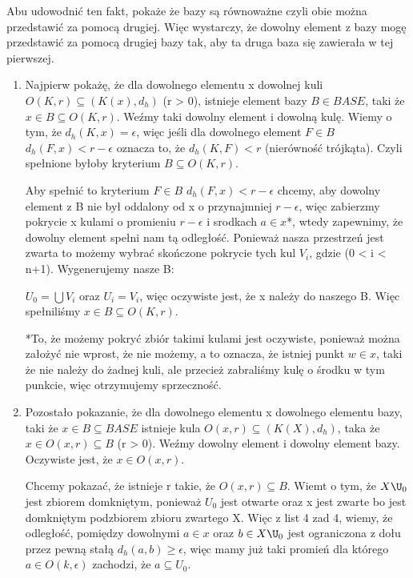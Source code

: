 \documentclass[12pt,a4paper]{article}
\begin{document}
Abu udowodnić ten fakt, pokaże że bazy są równoważne czyli obie można przedstawić za pomocą drugiej. Więc wystarczy, że dowolny element z bazy mogę przedstawić za pomocą drugiej bazy tak, aby ta druga baza się zawierała w tej pierwszej.
\begin{enumerate}
    \item Najpierw pokażę, że dla dowolnego elementu x dowolnej kuli $O(K,r) \subseteq (K(x),d_h)$ (r > 0), istnieje element bazy $B \in BASE$, taki że $x \in B \subseteq O(K,r)$. Weźmy taki dowolny element i dowolną kulę. Wiemy o tym, że $d_h(K,x) = \epsilon$, więc jeśli dla dowolnego element $F \in B$ $d_h(F, x) < r - \epsilon$ oznacza to, że $d_h(K,F) < r$ (nierówność trójkąta). Czyli spełnione byłoby kryterium $B \subseteq O(K,r)$. 

    Aby spełnić to kryterium  $F \in B$ $d_h(F, x) < r - \epsilon$ chcemy, aby dowolny element z B nie był oddalony od x o przynajmniej $ r - \epsilon$, więc zabierzmy pokrycie x kulami o promieniu  $r - \epsilon$ i srodkach $a\in x$*, wtedy zapewnimy, że dowolny element spełni nam tą odległość. Ponieważ nasza przestrzeń jest zwarta to możemy wybrać skończone pokrycie tych kul $V_i$, gdzie (0 < i < n+1). Wygenerujemy nasze B:
    
    $U_0 = \bigcup V_i$ oraz $U_i = V_i$, więc oczywiste jest, że x należy do naszego B. Więc spełniliśmy $x \in B \subseteq O(K,r)$.
    
    *To, że możemy pokryć zbiór takimi kulami jest oczywiste, ponieważ można założyć nie wprost, że nie możemy, a to oznacza, że istniej punkt $w \in x$, taki że nie należy do żadnej kuli, ale przecież zabraliśmy kulę o środku w tym punkcie, więc otrzymujemy sprzeczność.

    \item Pozostało pokazanie, że dla dowolnego elementu x dowolnego elementu bazy, taki że $x \in B \subseteq BASE$ istnieje kula $O(x,r) \subseteq (K(X), d_h)$, taka że $x \in O(x,r) \subseteq B$ (r > 0).
    Weźmy dowolny element i dowolny element bazy. Oczywiste jest, że $x \in O(x,r)$.
    
    Chcemy pokazać, że istnieje r takie, że $O(x,r) \subseteq B$. Wiemt o tym, że $X\U_0$ jest zbiorem domkniętym, ponieważ $U_0$ jest otwarte oraz x jest zwarte bo jest domkniętym podzbiorem zbioru zwartego X. Więc z list 4 zad 4, wiemy, że odległość, pomiędzy dowolnymi $a \in x$ oraz $b \in X\U_0$ jest ograniczona z dołu przez pewną stałą $d_h(a,b) \geq \epsilon$, więc mamy już taki promień dla którego $a \in O(k,\epsilon)$ zachodzi, że $a \subseteq U_0$.
    

\end{enumerate}
\end{document}
